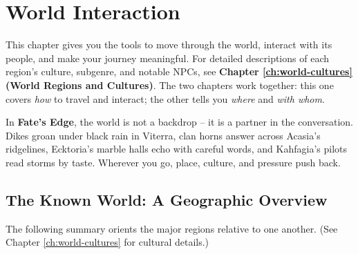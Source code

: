 \chapter{World Interaction}
\label{ch:world-interaction}

\begin{tcolorbox}[colback=blue!5!white, colframe=blue!75!black, title=Using This Chapter,breakable]
This chapter gives you the tools to move through the world, interact with its people, and make your journey meaningful. For detailed descriptions of each region's culture, subgenre, and notable NPCs, see \textbf{Chapter \ref{ch:world-cultures} (World Regions and Cultures)}. The two chapters work together: this one covers \emph{how} to travel and interact; the other tells you \emph{where} and \emph{with whom}.
\end{tcolorbox}

In \textbf{Fate's Edge}, the world is not a backdrop -- it is a partner in the conversation. Dikes groan under black rain in Viterra, clan horns answer across Acasia's ridgelines, Ecktoria's marble halls echo with careful words, and Kahfagia's pilots read storms by taste. Wherever you go, place, culture, and pressure push back.

\section{The Known World: A Geographic Overview}
\label{sec:known-world}

The following summary orients the major regions relative to one another. (See Chapter \ref{ch:world-cultures} for cultural details.)

